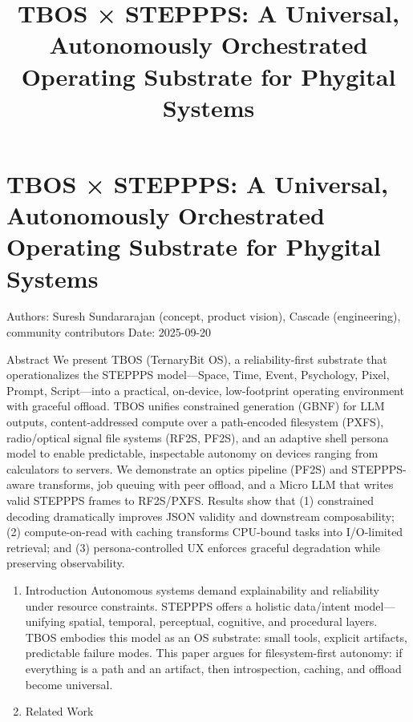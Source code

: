 \documentclass[]{article}
\title{TBOS × STEPPPS: A Universal, Autonomously Orchestrated Operating Substrate for Phygital Systems}
\date{}
\begin{document}
\maketitle

\hypertarget{tbos-steppps-a-universal-autonomously-orchestrated-operating-substrate-for-phygital-systems}{%
\section{TBOS × STEPPPS: A Universal, Autonomously Orchestrated
Operating Substrate for Phygital
Systems}\label{tbos-steppps-a-universal-autonomously-orchestrated-operating-substrate-for-phygital-systems}}

Authors: Suresh Sundararajan (concept, product vision), Cascade
(engineering), community contributors Date: 2025-09-20

Abstract We present TBOS (TernaryBit OS), a reliability-first substrate
that operationalizes the STEPPPS model---Space, Time, Event, Psychology,
Pixel, Prompt, Script---into a practical, on-device, low-footprint
operating environment with graceful offload. TBOS unifies constrained
generation (GBNF) for LLM outputs, content-addressed compute over a
path-encoded filesystem (PXFS), radio/optical signal file systems (RF2S,
PF2S), and an adaptive shell persona model to enable predictable,
inspectable autonomy on devices ranging from calculators to servers. We
demonstrate an optics pipeline (PF2S) and STEPPPS-aware transforms, job
queuing with peer offload, and a Micro LLM that writes valid STEPPPS
frames to RF2S/PXFS. Results show that (1) constrained decoding
dramatically improves JSON validity and downstream composability; (2)
compute-on-read with caching transforms CPU-bound tasks into I/O-limited
retrieval; and (3) persona-controlled UX enforces graceful degradation
while preserving observability.

\begin{enumerate}
\def\labelenumi{\arabic{enumi}.}
\item
  Introduction Autonomous systems demand explainability and reliability
  under resource constraints. STEPPPS offers a holistic data/intent
  model---unifying spatial, temporal, perceptual, cognitive, and
  procedural layers. TBOS embodies this model as an OS substrate: small
  tools, explicit artifacts, predictable failure modes. This paper
  argues for filesystem-first autonomy: if everything is a path and an
  artifact, then introspection, caching, and offload become universal.
\item
  Related Work
\end{enumerate}
\end{document}
